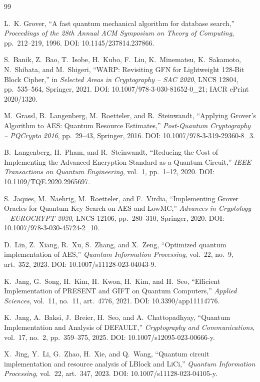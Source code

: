 \documentclass[pdflatex,sn-nature]{sn-jnl}
\theoremstyle{thmstyleone}
\theoremstyle{thmstyletwo}
\begin{document}
\begin{thebibliography}{99}

L.~K. Grover,
``A fast quantum mechanical algorithm for database search,''
\emph{Proceedings of the 28th Annual ACM Symposium on Theory of Computing}, pp.~212--219, 1996.
DOI: 10.1145/237814.237866.

S.~Banik, Z.~Bao, T.~Isobe, H.~Kubo, F.~Liu, K.~Minematsu, K.~Sakamoto, N.~Shibata, and M.~Shigeri,
``WARP: Revisiting GFN for Lightweight 128-Bit Block Cipher,''
in \emph{Selected Areas in Cryptography -- SAC 2020}, LNCS 12804, pp.~535--564, Springer, 2021.
DOI: 10.1007/978-3-030-81652-0\_21; IACR ePrint 2020/1320.

M.~Grassl, B.~Langenberg, M.~Roetteler, and R.~Steinwandt,
``Applying Grover's Algorithm to AES: Quantum Resource Estimates,''
\emph{Post-Quantum Cryptography -- PQCrypto 2016}, pp.~29--43, Springer, 2016.
DOI: 10.1007/978-3-319-29360-8\_3.

B.~Langenberg, H.~Pham, and R.~Steinwandt,
``Reducing the Cost of Implementing the Advanced Encryption Standard as a Quantum Circuit,''
\emph{IEEE Transactions on Quantum Engineering}, vol.~1, pp.~1--12, 2020.
DOI: 10.1109/TQE.2020.2965697.

S.~Jaques, M.~Naehrig, M.~Roetteler, and F.~Virdia,
``Implementing Grover Oracles for Quantum Key Search on AES and LowMC,''
\emph{Advances in Cryptology -- EUROCRYPT 2020}, LNCS 12106, pp.~280--310, Springer, 2020.
DOI: 10.1007/978-3-030-45724-2\_10.

D.~Lin, Z.~Xiang, R.~Xu, S.~Zhang, and X.~Zeng,
``Optimized quantum implementation of AES,''
\emph{Quantum Information Processing}, vol.~22, no.~9, art.~352, 2023.
DOI: 10.1007/s11128-023-04043-9.

K.~Jang, G.~Song, H.~Kim, H.~Kwon, H.~Kim, and H.~Seo,
``Efficient Implementation of PRESENT and GIFT on Quantum Computers,''
\emph{Applied Sciences}, vol.~11, no.~11, art.~4776, 2021.
DOI: 10.3390/app11114776.

K.~Jang, A.~Baksi, J.~Breier, H.~Seo, and A.~Chattopadhyay,
``Quantum Implementation and Analysis of DEFAULT,''
\emph{Cryptography and Communications}, vol.~17, no.~2, pp.~359--375, 2025.
DOI: 10.1007/s12095-023-00666-y.

X.~Jing, Y.~Li, G.~Zhao, H.~Xie, and Q.~Wang,
``Quantum circuit implementation and resource analysis of LBlock and LiCi,''
\emph{Quantum Information Processing}, vol.~22, art.~347, 2023.
DOI: 10.1007/s11128-023-04105-y.


\end{thebibliography}
\end{document}
